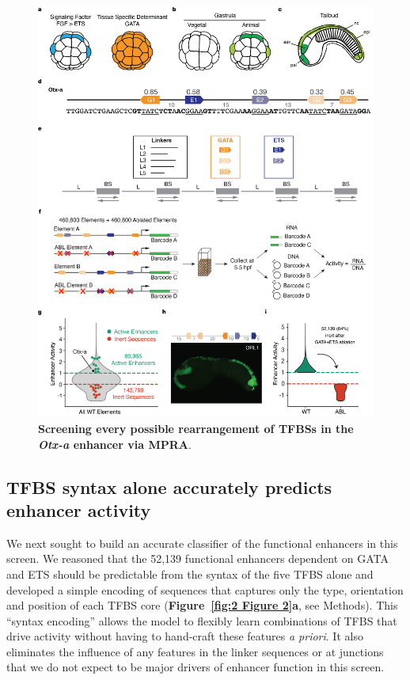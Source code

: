 \clearpage

\begin{figure}[!htbp]
    \centering
    \includegraphics[height=0.8\textheight, keepaspectratio]{2_figures-and-files/Fig1.png}
    \caption[Screening every possible rearrangement of TFBSs in the \textit{Otx-a} enhancer via MPRA.]{\textbf{Screening every possible rearrangement of TFBSs in the \textit{Otx-a} enhancer via MPRA}.}
    \label{fig:2 Figure 1}
\end{figure}

\clearpage


\subsection{TFBS syntax alone accurately predicts enhancer activity}

We next sought to build an accurate classifier of the functional enhancers in this screen. We reasoned that the 52,139 functional enhancers dependent on GATA and ETS should be predictable from the syntax of the five TFBS alone and developed a simple encoding of sequences that captures only the type, orientation and position of each TFBS core (\textbf{Figure~\ref{fig:2 Figure 2}a}, see Methods). This “syntax encoding” allows the model to flexibly learn combinations of TFBS that drive activity without having to hand-craft these features \textit{a priori}. It also eliminates the influence of any features in the linker sequences or at junctions that we do not expect to be major drivers of enhancer function in this screen.

